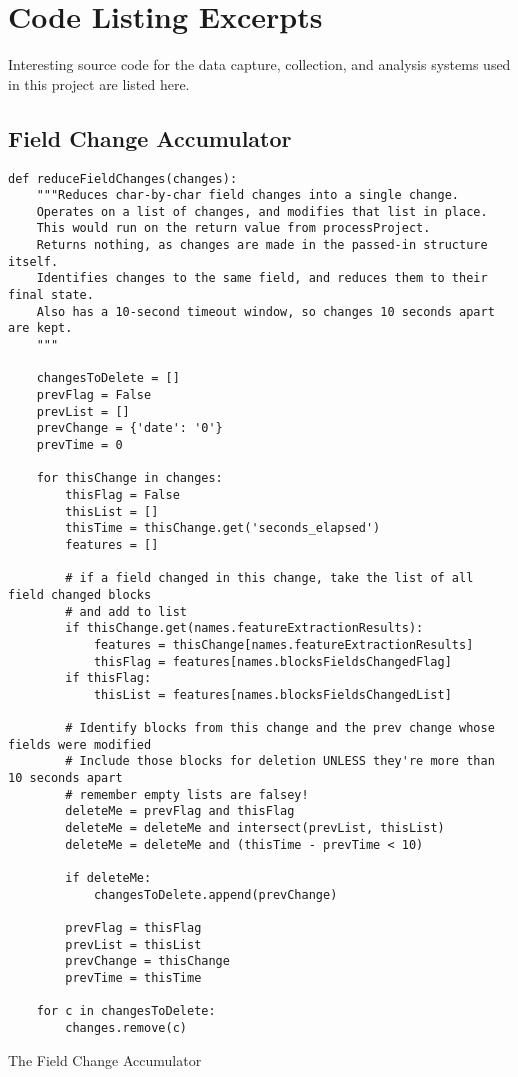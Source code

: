 \chapter{Code Listing Excerpts} \label{appendix:listings}

Interesting source code for the data capture, collection, and analysis systems used in this project are listed here. 


\section{Field Change Accumulator}
\label{src:reduceFieldChanges}

\begin{listing}[]
\begin{verbatim}
def reduceFieldChanges(changes):
    """Reduces char-by-char field changes into a single change.
    Operates on a list of changes, and modifies that list in place.
    This would run on the return value from processProject.
    Returns nothing, as changes are made in the passed-in structure itself.
    Identifies changes to the same field, and reduces them to their final state.
    Also has a 10-second timeout window, so changes 10 seconds apart are kept.
    """

    changesToDelete = []
    prevFlag = False
    prevList = []
    prevChange = {'date': '0'}
    prevTime = 0

    for thisChange in changes:
        thisFlag = False
        thisList = []
        thisTime = thisChange.get('seconds_elapsed')
        features = []

        # if a field changed in this change, take the list of all field changed blocks 
        # and add to list
        if thisChange.get(names.featureExtractionResults):
            features = thisChange[names.featureExtractionResults]
            thisFlag = features[names.blocksFieldsChangedFlag]
        if thisFlag:
            thisList = features[names.blocksFieldsChangedList]

        # Identify blocks from this change and the prev change whose fields were modified
        # Include those blocks for deletion UNLESS they're more than 10 seconds apart
        # remember empty lists are falsey!
        deleteMe = prevFlag and thisFlag
        deleteMe = deleteMe and intersect(prevList, thisList)
        deleteMe = deleteMe and (thisTime - prevTime < 10)

        if deleteMe:
            changesToDelete.append(prevChange)

        prevFlag = thisFlag
        prevList = thisList
        prevChange = thisChange
        prevTime = thisTime

    for c in changesToDelete:
        changes.remove(c)
\end{verbatim}
\caption{The Field Change Accumulator}
\label{src:lst:field-change}
\end{listing}

